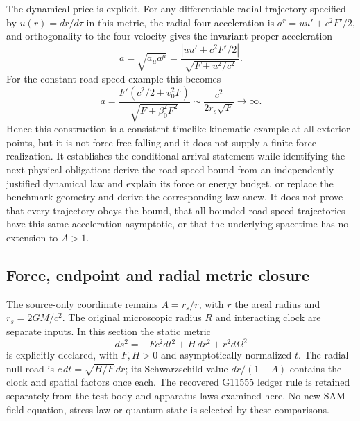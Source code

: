 \documentclass[10pt,twocolumn,letterpaper]{article}
\begin{document}
The dynamical price is explicit. For any differentiable radial trajectory
specified by $u(r)=dr/d\tau$ in this metric, the radial four-acceleration is
$a^r=u u'+c^2F'/2$, and orthogonality to the four-velocity gives the
invariant proper acceleration
\begin{equation}
 a=\sqrt{a_\mu a^\mu}
   =\frac{|u u'+c^2F'/2|}{\sqrt{F+u^2/c^2}}.
 \label{eq:ch5-road-acceleration}
\end{equation}
For the constant-road-speed example this becomes
\begin{equation}
 a=\frac{F'(c^2/2+v_0^2F)}{\sqrt{F+\beta_0^2F^2}}
   \sim\frac{c^2}{2r_s\sqrt F}\longrightarrow\infty.
 \label{eq:ch5-road-acceleration-divergence}
\end{equation}
Hence this construction is a consistent timelike kinematic example at
all exterior points, but it is not force-free falling and it does not
supply a finite-force realization. It establishes the conditional arrival
statement while identifying the next physical obligation: derive the
road-speed bound from an independently justified dynamical law and explain
its force or energy budget, or replace the benchmark geometry and derive
the corresponding law anew. It does not prove that every trajectory
obeys the bound, that all bounded-road-speed trajectories have this same
acceleration asymptotic, or that the underlying spacetime has no extension
to $A>1$.


\subsection{Force, endpoint and radial metric closure}
\label{sec:ch5-new-closure}
The source-only coordinate remains $A=r_s/r$, with $r$ the areal
radius and $r_s=2GM/c^2$. The original microscopic radius $R$ and
interacting clock are separate inputs. In this section the static metric
\[
 ds^2=-Fc^2dt^2+H\,dr^2+r^2d\Omega^2
\]
is explicitly declared, with $F,H>0$ and asymptotically normalized $t$.
The radial null road is $c\,dt=\sqrt{H/F}\,dr$; its Schwarzschild
value $dr/(1-A)$ contains the clock and spatial factors once each.
The recovered G11555 ledger rule is retained separately from the
test-body and apparatus laws examined here. No new SAM field equation,
stress law or quantum state is selected by these comparisons.
\end{document}
